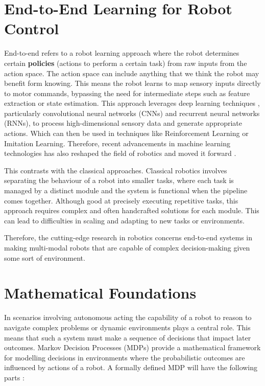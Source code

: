 \section{End-to-End Learning for Robot Control}

  End-to-end refers to a robot learning approach where the robot determines certain \textbf{policies} (actions to perform a certain task) from raw inputs from the action space. The action space can include anything that we think the robot may benefit form knowing. This means the 
  robot learns to map sensory inputs directly to motor commands, bypassing the need for intermediate steps such as feature extraction or state estimation. This approach leverages deep learning techniques \cite{Schmidhuber2015nn}, particularly convolutional neural networks (CNNs) and recurrent neural networks (RNNs), to process high-dimensional sensory data and generate appropriate actions. Which can then be used in techniques like Reinforcement Learning  or Imitation Learning.  Therefore, recent advancements in machine learning technologies has also reshaped the field of robotics and moved it forward \cite{Pierson18082017,newbury2023graspSynthReview,liu2021DRLminireview}.


  This contrasts with the classical approaches. Classical robotics involves separating the behaviour of a robot into smaller tasks, where each task is managed by a distinct module and the system is functional when the pipeline comes together. Although good at precisely executing repetitive tasks, this approach requires complex and often handcrafted solutions for each module. This can lead to difficulties in scaling and adapting to new tasks or environments. 
  
  Therefore, the cutting-edge research in robotics concerns end-to-end systems in making multi-modal robots  that are capable of complex decision-making given some sort of environment.
  
\section{Mathematical Foundations}
  In scenarios involving autonomous acting the capability of a robot to reason to navigate complex problems or dynamic environments plays a central role. This means that such a system must make a sequence of decisions that impact later outcomes. Markov Decision Processes (MDPs) provide a mathematical framework for modelling decisions in environments where the probabilistic outcomes are influenced by actions of a robot. A formally defined MDP will have the following parts \cite{silver2015}:

